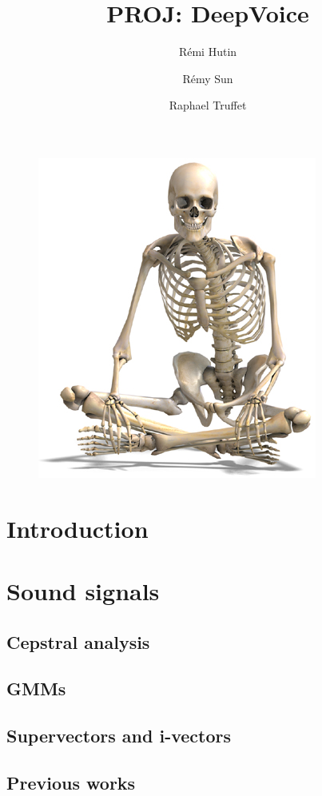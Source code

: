 \documentclass[conference]{IEEEtran}
\title{PROJ: DeepVoice}
\author{Rémi Hutin \and Rémy Sun \and Raphael Truffet}
\begin{document}
\maketitle


\begin{figure}[!h]
    \centering
    \includegraphics[scale=2]{squelette.jpg}
\end{figure}

\section{Introduction}

\section{Sound signals}

\subsection{Cepstral analysis}

\subsection{GMMs}

\subsection{Supervectors and i-vectors}

\subsection{Previous works}
\end{document}

